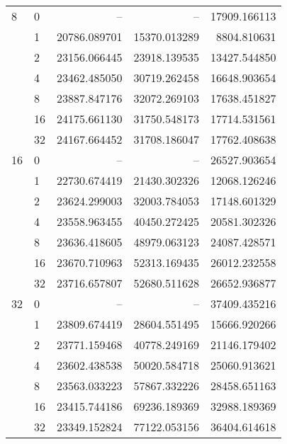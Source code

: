 \begin{tabular}{llrrr}
8  & 0  &           -- &            -- &  17909.166113 \\
   & 1  &  20786.089701 &   15370.013289 &   8804.810631 \\
   & 2  &  23156.066445 &   23918.139535 &  13427.544850 \\
   & 4  &  23462.485050 &   30719.262458 &  16648.903654 \\
   & 8  &  23887.847176 &   32072.269103 &  17638.451827 \\
   & 16 &  24175.661130 &   31750.548173 &  17714.531561 \\
   & 32 &  24167.664452 &   31708.186047 &  17762.408638 \\
16 & 0  &           -- &            -- &  26527.903654 \\
   & 1  &  22730.674419 &   21430.302326 &  12068.126246 \\
   & 2  &  23624.299003 &   32003.784053 &  17148.601329 \\
   & 4  &  23558.963455 &   40450.272425 &  20581.302326 \\
   & 8  &  23636.418605 &   48979.063123 &  24087.428571 \\
   & 16 &  23670.710963 &   52313.169435 &  26012.232558 \\
   & 32 &  23716.657807 &   52680.511628 &  26652.936877 \\
32 & 0  &           -- &            -- &  37409.435216 \\
   & 1  &  23809.674419 &   28604.551495 &  15666.920266 \\
   & 2  &  23771.159468 &   40778.249169 &  21146.179402 \\
   & 4  &  23602.438538 &   50020.584718 &  25060.913621 \\
   & 8  &  23563.033223 &   57867.332226 &  28458.651163 \\
   & 16 &  23415.744186 &   69236.189369 &  32988.189369 \\
   & 32 &  23349.152824 &   77122.053156 &  36404.614618 \\
\bottomrule
\end{tabular}
